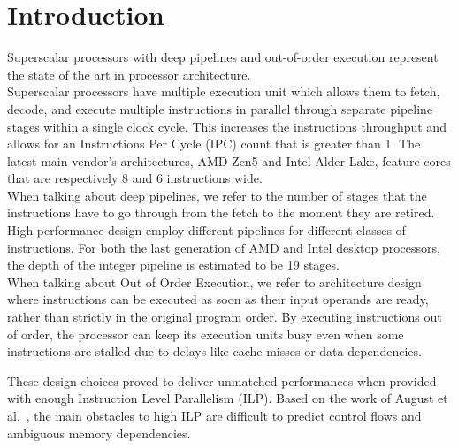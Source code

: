 \section{Introduction}

Superscalar processors with deep pipelines and out-of-order execution represent the state of the art in processor architecture. \\
Superscalar processors have multiple execution unit which allows them to fetch, decode, and execute multiple instructions in parallel through separate pipeline stages within a single clock cycle. This increases the instructions throughput and allows for an Instructions Per Cycle (IPC) count that is greater than 1. The latest main vendor's architectures, AMD Zen5 and Intel Alder Lake, feature cores that are respectively 8 and 6 instructions wide. \\
When talking about deep pipelines, we refer to the number of stages that the instructions have to go through from the fetch to the moment they are retired. High performance design employ different pipelines for different classes of instructions. For both the last generation of AMD and Intel desktop processors, the depth of the integer pipeline is estimated to be 19 stages. \\
When talking about Out of Order Execution, we refer to architecture design where instructions can be executed as soon as their input operands are ready, rather than strictly in the original program order. By executing instructions out of order, the processor can keep its execution units busy even when some instructions are stalled due to delays like cache misses or data dependencies. 

These design choices proved to deliver unmatched performances when provided with enough Instruction Level Parallelism (ILP). Based on the work of August et al.~\cite{August98}, the main obstacles to high ILP are difficult to predict control flows and ambiguous memory dependencies. 

